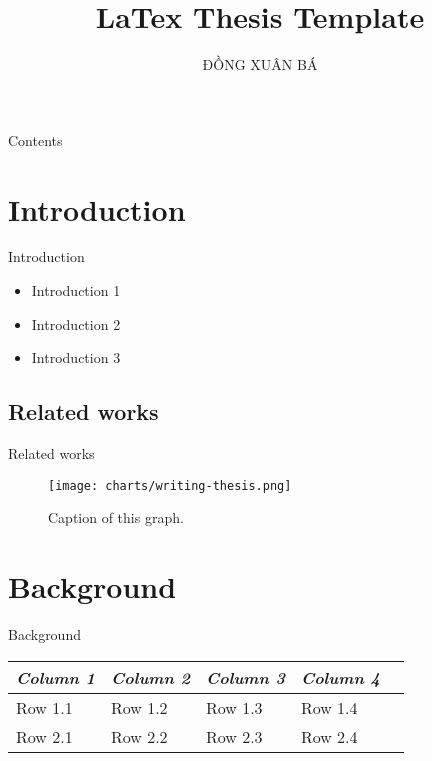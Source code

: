 \documentclass[11pt]{beamer}
\title{LaTex Thesis Template}
\institute{Japan Advanced Institute of Science And Technology}
\author{ĐỒNG XUÂN BÁ}
\begin{document}
 
\begin{frame}
\titlepage %
\end{frame}
 
\begin{frame}{Contents}
\tableofcontents %
\end{frame}
 
\section{Introduction}
\begin{frame}{Introduction}
\begin{itemize}
\item Introduction 1
\item Introduction 2
\item Introduction 3
\end{itemize}
\end{frame}
 
\subsection{Related works}
\begin{frame}{Related works}
 
\begin{figure}[h!]
\texttt{[image: charts/writing-thesis.png]}
\caption{Caption of this graph.}
\label{fig:writing-thesis}
\end{figure}
\end{frame}
 
\section{Background}
\begin{frame}{Background}
\begin{center}
 
\begin{tabular} {l l l l l}
\toprule
\it Column 1 & \it Column 2 & \it Column 3 & \it Column 4 \\
\midrule
 
Row 1.1 & Row 1.2 & Row 1.3 & Row 1.4 \\
Row 2.1 & Row 2.2 & Row 2.3 & Row 2.4 \\
 
\bottomrule
\end{tabular}
 
\end{center}
\end{frame}
 
\end{document}

